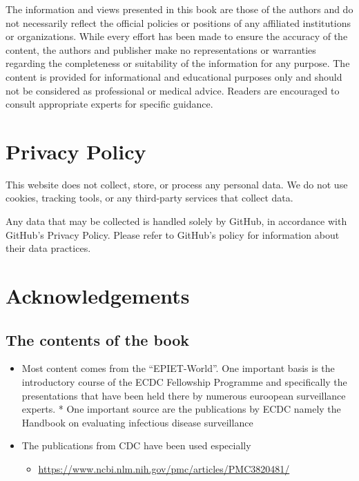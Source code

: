 \documentclass[
  letterpaper,
  DIV=11,
  numbers=noendperiod]{scrreprt}
\providecommand{\tightlist}{%
  \setlength{\itemsep}{0pt}\setlength{\parskip}{0pt}}\usepackage{longtable,booktabs,array}
\begin{document}

The information and views presented in this book are those of the
authors and do not necessarily reflect the official policies or
positions of any affiliated institutions or organizations. While every
effort has been made to ensure the accuracy of the content, the authors
and publisher make no representations or warranties regarding the
completeness or suitability of the information for any purpose. The
content is provided for informational and educational purposes only and
should not be considered as professional or medical advice. Readers are
encouraged to consult appropriate experts for specific guidance.

\section*{Privacy Policy}\label{privacy-policy}


This website does not collect, store, or process any personal data. We
do not use cookies, tracking tools, or any third-party services that
collect data.

Any data that may be collected is handled solely by GitHub, in
accordance with GitHub's Privacy Policy. Please refer to GitHub's policy
for information about their data practices.

\section*{Acknowledgements}\label{acknowledgements}


\subsection*{The contents of the book}\label{the-contents-of-the-book}

\begin{itemize}
\tightlist
\item
  Most content comes from the ``EPIET-World''. One important basis is
  the introductory course of the ECDC Fellowship Programme and
  specifically the presentations that have been held there by numerous
  euroopean surveillance experts. * One important source are the
  publications by ECDC namely the Handbook on evaluating infectious
  disease surveillance
\item
  The publications from CDC have been used especially

  \begin{itemize}
  \tightlist
  \item
    \url{https://www.ncbi.nlm.nih.gov/pmc/articles/PMC3820481/}
  \end{itemize}
\end{itemize}
\end{document}
